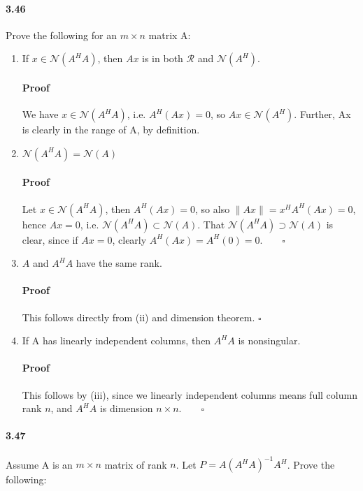 \documentclass[letterpaper,12pt]{article}
\theoremstyle{definition}
\begin{document}
\paragraph{3.46} Prove the following for an $m \times n$ matrix A:

\begin{enumerate}[label=(\roman*)]

\item If $x \in \mathscr{N}(A^HA)$, then $Ax$ is in both $\mathscr{R}$ and $\mathscr{N}(A^H)$.

\paragraph{Proof} We have $x \in \mathscr{N}(A^HA)$, i.e. $A^H(Ax) = 0$, so $Ax \in \mathscr{N}(A^H)$. Further, Ax is clearly in the range of A, by definition.

\item $\mathscr{N}(A^HA) = \mathscr{N}(A)$

\paragraph{Proof} Let  $x \in \mathscr{N}(A^HA)$, then $A^H(Ax) = 0$, so also $\|Ax\| = x^HA^H(Ax) = 0$, hence $Ax = 0$, i.e. $\mathscr{N}(A^HA) \subset \mathscr{N}(A)$. That $\mathscr{N}(A^HA) \supset \mathscr{N}(A)$ is clear, since if $Ax = 0$, clearly $A^H(Ax) = A^H(0) = 0. \qquad \square$

\item $A$ and $A^HA$ have the same rank.

\paragraph{Proof} This follows directly from (ii) and dimension theorem. $\square$

\item If A has linearly independent columns, then $A^HA$ is nonsingular.

\paragraph{Proof} This follows by (iii), since we linearly independent columns means full column rank $n$, and $A^HA$ is dimension $n \times n . \qquad \square$

\end{enumerate}


\paragraph{3.47} Assume A is an $m \times n$ matrix of rank $n$. Let $P = A(A^HA)^{-1}A^H$. Prove the following:
\end{document}
